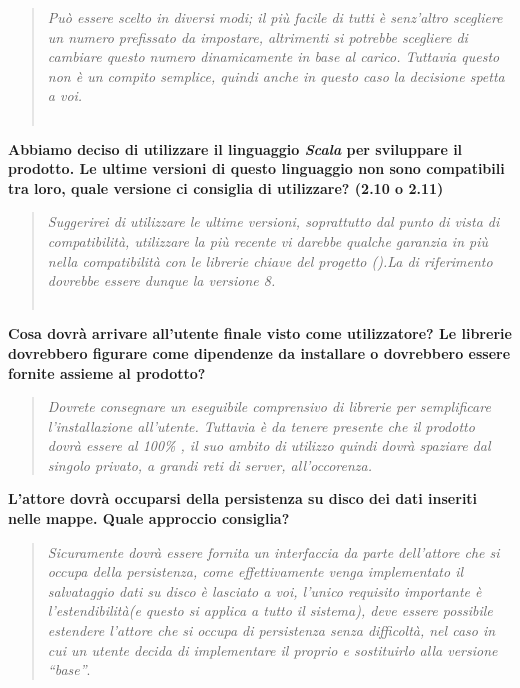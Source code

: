 \documentclass{scalatekids-article}
\begin{document}
\begin{quote}
  \textit{Può essere scelto in diversi modi; il più facile di tutti è senz'altro scegliere un numero prefissato da impostare, altrimenti si potrebbe scegliere di cambiare questo numero dinamicamente in base al carico. Tuttavia questo non è un compito semplice, quindi anche in questo caso la decisione spetta a voi.\\ \\}
\end{quote}
\textbf{Abbiamo deciso di utilizzare il linguaggio \textit{Scala} per sviluppare il prodotto. Le ultime versioni di questo linguaggio non sono compatibili tra loro, quale versione ci consiglia di utilizzare? (2.10 o 2.11)}
\begin{quote}
  \textit{Suggerirei di utilizzare le ultime versioni, soprattutto dal punto di
    vista di compatibilità, utilizzare la  più recente vi darebbe qualche
    garanzia in più nella compatibilità con le librerie chiave del progetto
    ().La  di riferimento dovrebbe essere dunque la
    versione 8.\\ \\}
\end{quote}
\textbf{Cosa dovrà arrivare all'utente finale visto come utilizzatore? Le librerie  dovrebbero figurare come dipendenze da installare o dovrebbero essere fornite assieme al prodotto?}
\begin{quote}
  \textit{Dovrete consegnare un eseguibile comprensivo di librerie
     per semplificare l'installazione all'utente. Tuttavia è da
    tenere presente che il prodotto dovrà essere al 100\% , il suo ambito di utilizzo quindi dovrà spaziare dal singolo
    privato, a grandi reti di server, all'occorenza.}
\end{quote}
\textbf{L'attore  dovrà occuparsi della persistenza su disco dei dati inseriti nelle mappe. Quale approccio consiglia?}
\begin{quote}
  \textit{Sicuramente dovrà essere fornita un interfaccia da parte dell'attore
    che si occupa della persistenza, come effettivamente venga implementato il
    salvataggio dati su disco è lasciato a voi, l'unico requisito importante è
    l'estendibilità(e questo si applica a tutto il sistema), deve essere
    possibile estendere l'attore che si occupa di persistenza senza difficoltà,
    nel caso in cui un utente decida di implementare il proprio
     e sostituirlo alla versione ``base''}.
\end{quote}
\end{document}
